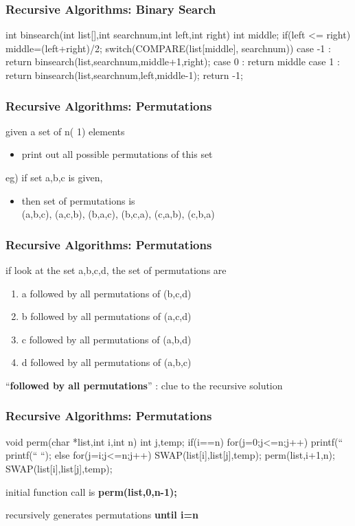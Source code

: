 \documentclass[newPxFont,sthlmFooter,nooffset]{beamer}
\begin{document}
\begin{frame}[t, fragile]
  \frametitle{Recursive Algorithms: Binary Search}
\begin{codedef}
int binsearch(int list[],int searchnum,int left,int right) {
   int middle;
   if(left <= right) {
      middle=(left+right)/2; 
      switch(COMPARE(list[middle], searchnum)) { 
         case -1 : return
            binsearch(list,searchnum,middle+1,right); 
         case 0 : return middle
         case 1 : return
            binsearch(list,searchnum,left,middle-1); 
      }
   }
   return -1; 
}    
\end{codedef}
\end{frame}

\begin{frame}[t]
  \frametitle{Recursive Algorithms: Permutations}
given a set of n( 1) elements 
\begin{itemize}
\item print out all possible permutations of this set
\end{itemize}


eg) if set {a,b,c} is given,
\begin{itemize}
\item then set of permutations is \\
      {(a,b,c), (a,c,b), (b,a,c), (b,c,a),
    (c,a,b), (c,b,a)}
\end{itemize}

\end{frame}

\begin{frame}[t]
  \frametitle{Recursive Algorithms: Permutations}
if look at the set {a,b,c,d}, the set of permutations are

\begin{enumerate}
\item a followed by all permutations of (b,c,d)
\item b followed by all permutations of (a,c,d)
\item c followed by all permutations of (a,b,d)
\item d followed by all permutations of (a,b,c)
\end{enumerate}

``\textbf{followed by all permutations}'' : clue to the recursive solution
\end{frame}

\begin{frame}[t, fragile]
  \frametitle{Recursive Algorithms: Permutations}
\begin{codedef}
void perm(char *list,int i,int n) {
	int j,temp;
	if(i==n) {
		for(j=0;j<=n;j++)
		printf(“%
		printf(“     “);
	}
	else {
		for(j=i;j<=n;j++) {
			SWAP(list[i],list[j],temp);
			perm(list,i+1,n);
			SWAP(list[i],list[j],temp);
		}
	}  
}  
\end{codedef}
 	initial function call is \textbf{perm(list,0,n-1);}
 	
 	recursively generates permutations \textbf{until i=n}
 	
\end{frame}
\end{document}
